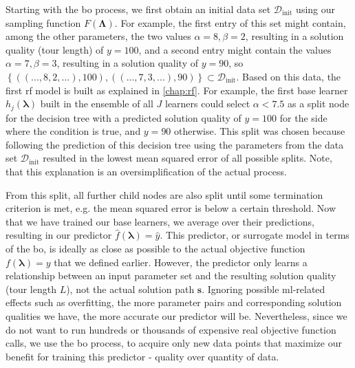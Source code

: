 Starting with the \gls{bo} process, we first obtain an initial data set $\mathcal{D}_\text{init}$ using our sampling function $F(\mathbf{\Lambda})$. For example, the first entry of this set might contain, among the other parameters, the two values $\alpha = 8, \beta = 2$, resulting in a solution quality (tour length) of $y = 100$, and a second entry might contain the values $\alpha = 7, \beta = 3$, resulting in a solution quality of $y=90$, so $\left\lbrace ((...,8,2,...), 100), ((...,7,3,...), 90) \right\rbrace \subset \mathcal{D}_\text{init}$. Based on this data, the first \gls{rf} model is built as explained in \cref{chap:rf}. For example, the first base learner $h_j(\mathbf{\lambda})$ built in the ensemble of all $J$ learners could select $\alpha < 7.5$ as a split node for the decision tree with a predicted solution quality of $y=100$ for the side where the condition is true, and $y=90$ otherwise. This split was chosen because following the prediction of this decision tree using the parameters from the data set $\mathcal{D}_\text{init}$ resulted in the lowest mean squared error of all possible splits. Note, that this explanation is an oversimplification of the actual process. 

From this split, all further child nodes are also split until some termination criterion is met, e.g. the mean squared error is below a certain threshold. Now that we have trained our base learners, we average over their predictions, resulting in our predictor $\hat{f}(\mathbf{\lambda}) = \hat{y}$. This predictor, or surrogate model in terms of the \gls{bo}, is ideally as close as possible to the actual objective function $f(\mathbf{\lambda}) = y$ that we defined earlier. However, the predictor only learns a relationship between an input parameter set and the resulting solution quality (tour length $L$), not the actual solution path $\mathbf{s}$. Ignoring possible \gls{ml}-related effects such as overfitting, the more parameter pairs and corresponding solution qualities we have, the more accurate our predictor will be. Nevertheless, since we do not want to run hundreds or thousands of expensive real objective function calls, we use the \gls{bo} process, to acquire only new data points that maximize our benefit for training this predictor - quality over quantity of data.

